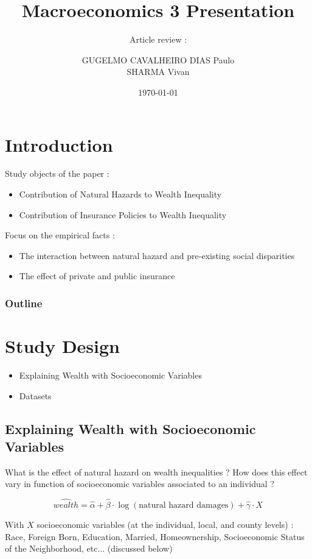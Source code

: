\documentclass{beamer}
\title{Macroeconomics 3 Presentation}
\subtitle{Article review :}
\author{GUGELMO CAVALHEIRO DIAS Paulo \\ SHARMA Vivan}
\institute{Sciences Po}
\date{\today}
\begin{document}
\begin{frame}
    \titlepage
\end{frame}


\section{Introduction}

\begin{frame}{\secname}
    Study objects of the paper : 
    \begin{itemize}
        \item Contribution of Natural Hazards to Wealth Inequality
        \item Contribution of Insurance Policies to Wealth Inequality
    \end{itemize}
    Focus on the empirical facts : 
    \begin{itemize}
        \item The interaction between natural hazard and pre-existing social disparities
        \item The effect of private and public insurance
    \end{itemize}
\end{frame}

\begin{frame}
    \frametitle{Outline}
    \tableofcontents[hideallsubsections]
\end{frame}

\section{Study Design}
    \begin{frame}{\secname}
        \begin{itemize}
            \item Explaining Wealth with Socioeconomic Variables
            \item Datasets 
        \end{itemize}
    \end{frame}

\subsection{Explaining Wealth with Socioeconomic Variables}
\begin{frame}{\subsecname}
    What is the effect of natural hazard on wealth inequalities ? 
    How does this effect vary in function of socioeconomic variables associated to an individual ? 

    \begin{equation*}
        \widehat{wealth} = \widehat{\alpha} + \widehat{\beta} \cdot \log(\text{natural hazard damages}) + \widehat{\gamma} \cdot X
    \end{equation*}

    With $X$ socioeconomic variables (at the individual, local, and county levels) :
    Race, Foreign Born, Education, Married, Homeownership, Socioeconomic Status of the Neighborhood, etc...
    (discussed below)
\end{frame}
\end{document}
